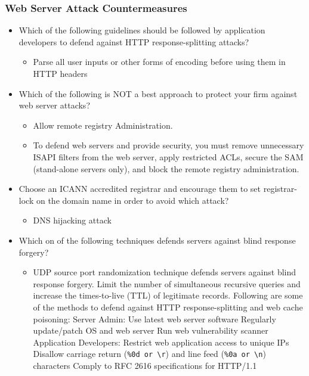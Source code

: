 \subsubsection{Web Server Attack Countermeasures}
\begin{itemize}
    \item Which of the following guidelines should be followed by application developers to defend against HTTP response-splitting attacks?
    \begin{itemize}
        \item Parse all user inputs or other forms of encoding before using them in HTTP headers
    \end{itemize}
    \item Which of the following is NOT a best approach to protect your firm against web server attacks?
    \begin{itemize}
        \item Allow remote registry Administration.
        \item To defend web servers and provide security, you must remove unnecessary ISAPI filters from the web server, apply restricted ACLs, secure the SAM (stand-alone servers only), and block the remote registry administration.
    \end{itemize}
    \item Choose an ICANN accredited registrar and encourage them to set registrar-lock on the domain name in order to avoid which attack?
    \begin{itemize}
        \item DNS hijacking attack
    \end{itemize}
    \item Which on of the following techniques defends servers against blind response forgery?
    \begin{itemize}
        \item UDP source port randomization technique defends servers against blind response forgery. Limit the number of simultaneous recursive queries and increase the times-to-live (TTL) of legitimate records.
        Following are some of the methods to defend against HTTP response-splitting and web cache poisoning:
        Server Admin:
        Use latest web server software
        Regularly update/patch OS and web server
        Run web vulnerability scanner
        Application Developers:
        Restrict web application access to unique IPs
        Disallow carriage return (\verb|%0d or \r|) and line feed (\verb|%0a or \n|) characters
        Comply to RFC 2616 specifications for HTTP/1.1
    \end{itemize}
\end{itemize}
